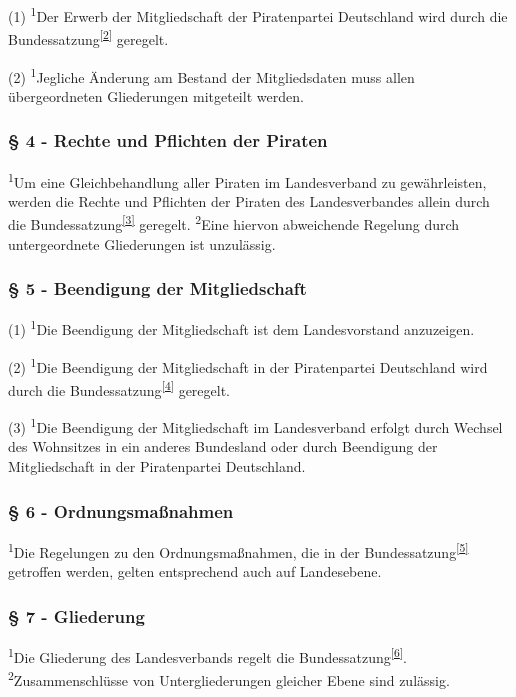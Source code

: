 (1) \textsuperscript{1}Der Erwerb der Mitgliedschaft der Piratenpartei
Deutschland wird durch die
Bundessatzung\textsuperscript{\href{\#cite\_note-1}{{[}2{]}}} geregelt.

(2) \textsuperscript{1}Jegliche Änderung am Bestand der Mitgliedsdaten
muss allen übergeordneten Gliederungen mitgeteilt werden.

\subsubsection{§ 4 - Rechte und Pflichten der Piraten}

\textsuperscript{1}Um eine Gleichbehandlung aller Piraten im
Landesverband zu gewährleisten, werden die Rechte und Pflichten der
Piraten des Landesverbandes allein durch die
Bundessatzung\textsuperscript{\href{\#cite\_note-2}{{[}3{]}}} geregelt.
\textsuperscript{2}Eine hiervon abweichende Regelung durch
untergeordnete Gliederungen ist unzulässig.

\subsubsection{§ 5 - Beendigung der Mitgliedschaft}

(1) \textsuperscript{1}Die Beendigung der Mitgliedschaft ist dem
Landesvorstand anzuzeigen.

(2) \textsuperscript{1}Die Beendigung der Mitgliedschaft in der
Piratenpartei Deutschland wird durch die
Bundessatzung\textsuperscript{\href{\#cite\_note-3}{{[}4{]}}} geregelt.

(3) \textsuperscript{1}Die Beendigung der Mitgliedschaft im
Landesverband erfolgt durch Wechsel des Wohnsitzes in ein anderes
Bundesland oder durch Beendigung der Mitgliedschaft in der Piratenpartei
Deutschland.

\subsubsection{§ 6 - Ordnungsmaßnahmen}

\textsuperscript{1}Die Regelungen zu den Ordnungsmaßnahmen, die in der
Bundessatzung\textsuperscript{\href{\#cite\_note-4}{{[}5{]}}} getroffen
werden, gelten entsprechend auch auf Landesebene.

\subsubsection{§ 7 - Gliederung}

\textsuperscript{1}Die Gliederung des Landesverbands regelt die
Bundessatzung\textsuperscript{\href{\#cite\_note-5}{{[}6{]}}}.
\textsuperscript{2}Zusammenschlüsse von Untergliederungen gleicher Ebene
sind zulässig.

